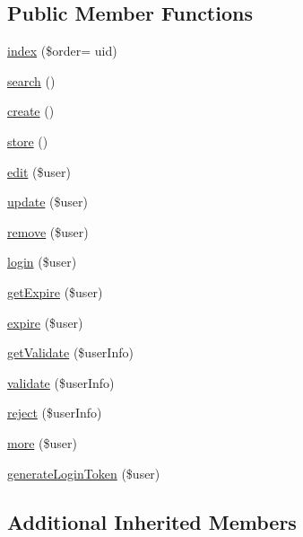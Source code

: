 \subsection*{Public Member Functions}
\begin{DoxyCompactItemize}
\item 
\hyperlink{class_staff_user_controller_ac42690d157805d42a49e0e91c2cf0823}{index} (\$order= \textquotesingle{}uid\textquotesingle{})
\item 
\hyperlink{class_staff_user_controller_a796bf438724e047aeef18579732a3780}{search} ()
\item 
\hyperlink{class_staff_user_controller_a435e7d7525d4bcd0ed5e34a469f3adf6}{create} ()
\item 
\hyperlink{class_staff_user_controller_a98e4b7b7529a9a5f6d7e96909cba8bfe}{store} ()
\item 
\hyperlink{class_staff_user_controller_a1ba3c1faf06001f5e66afb7911923373}{edit} (\$user)
\item 
\hyperlink{class_staff_user_controller_a34ccb228cbaf74c9f780d756d238e038}{update} (\$user)
\item 
\hyperlink{class_staff_user_controller_a8263104a35fee41a01d0f2120f83fa62}{remove} (\$user)
\item 
\hyperlink{class_staff_user_controller_a8e6439a5d2b5ba76dd1b2d97d541b2d6}{login} (\$user)
\item 
\hyperlink{class_staff_user_controller_aa8c78fb3dbc22e68c5b0c28903d9f6fc}{get\+Expire} (\$user)
\item 
\hyperlink{class_staff_user_controller_a906b5a21696b4b3cf97c7580aceee4ec}{expire} (\$user)
\item 
\hyperlink{class_staff_user_controller_a7f0ef11d58966605499f89f28518e743}{get\+Validate} (\$user\+Info)
\item 
\hyperlink{class_staff_user_controller_a7bdb48df8ccc4764c0fe460b3c5bcd5f}{validate} (\$user\+Info)
\item 
\hyperlink{class_staff_user_controller_ac41159a8bb25bb396067c30702554a2f}{reject} (\$user\+Info)
\item 
\hyperlink{class_staff_user_controller_a37a65f7457547c7152eef7f2f42c25e1}{more} (\$user)
\item 
\hyperlink{class_staff_user_controller_a741fe45e101eb3b3e62b19954087e9a5}{generate\+Login\+Token} (\$user)
\end{DoxyCompactItemize}
\subsection*{Additional Inherited Members}


